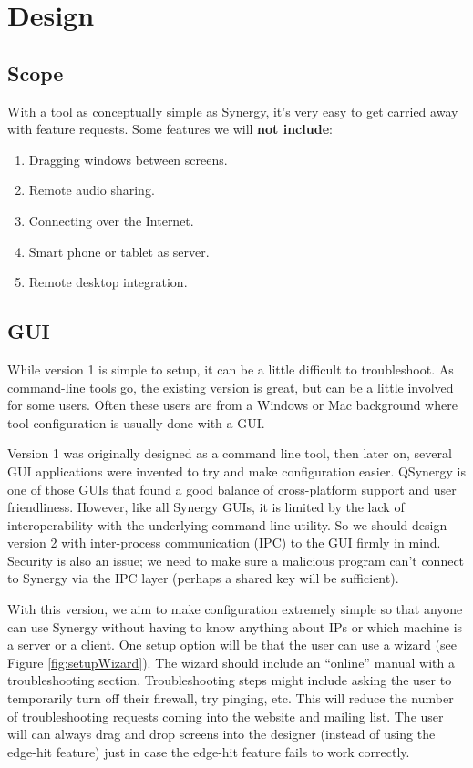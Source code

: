 \section{Design}

\subsection{Scope}

With a tool as conceptually simple as Synergy, it's very easy to get carried
away with feature requests. Some features we will \textbf{not include}:

\begin{enumerate}
  \item Dragging windows between screens.
  \item Remote audio sharing.
  \item Connecting over the Internet.
  \item Smart phone or tablet as server.
  \item Remote desktop integration.
\end{enumerate}

\subsection{GUI}

While version 1 is simple to setup, it can be a little difficult to
troubleshoot. As command-line tools go, the existing version is great, but
can be a little involved for some users. Often these users are from a Windows
or Mac background where tool configuration is usually done with a GUI.

Version 1 was originally designed as a command line tool, then later on, several
GUI applications were invented to try and make configuration easier. QSynergy is
one of those GUIs that found a good balance of cross-platform support and user 
friendliness. However, like all Synergy GUIs, it is limited by the lack of 
interoperability with the underlying command line utility. So we should design 
version 2 with inter-process communication (IPC) to the GUI firmly in mind. 
Security is also an issue; we need to make sure a malicious program can't
connect to Synergy via the IPC layer (perhaps a shared key will be sufficient).

With this version, we aim to make configuration extremely simple so that anyone
can use Synergy without having to know anything about IPs or which machine is a
server or a client. One setup option will be that the user can use a wizard (see
Figure \ref{fig:setupWizard}). The wizard should include an ``online'' manual 
with a troubleshooting section. Troubleshooting steps might include asking the 
user to temporarily turn off their firewall, try pinging, etc. This will reduce
the number of troubleshooting requests coming into the website and mailing list.
The user will can always drag and drop screens into the designer (instead of
using the edge-hit feature) just in case the edge-hit feature fails to work
correctly.


